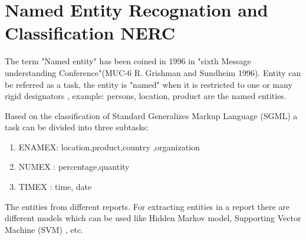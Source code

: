 \section{ Named Entity Recognation and Classification  NERC}
The term "Named entity" has been coined in 1996 in "sixth  Message understanding Conference"(MUC-6  R. Grishman and  Sundheim 1996).
Entity can be referred as a task, the entity is "named" when it is restricted to one or many rigid designators \citep{sharnagat2014named}, example: persons, location, product are the named entities.

Based on the classification of Standard Generalizes Markup Language (SGML) a task can be divided into three subtasks:
\begin{enumerate}
\item ENAMEX: location,product,country ,organization
\item NUMEX : percentage,quantity 
\item TIMEX : time, date
\end{enumerate}


The entities from different reports.
For extracting entities in a report there are different models which can be used like Hidden Markov model, Supporting Vector Machine (SVM) , etc.

